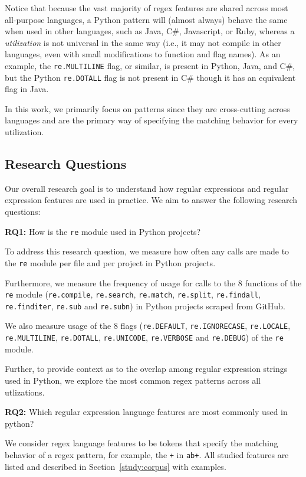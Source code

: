 Notice that because the vast majority of regex features are shared across most all-purpose languages, a Python {pattern} will (almost always) behave the same when used in other languages, such as Java, C\#, Javascript, or Ruby, whereas a \emph{utilization} is not universal in the same way (i.e., it may not compile in other languages, even with small modifications to function and flag names). As an example, the {\tt re.MULTILINE} flag, or similar, is present in Python, Java, and C\#, but  the Python {\tt re.DOTALL} flag is not present in C\# though it has an equivalent flag in Java.  

In this work, we primarily focus on patterns since they are cross-cutting across languages and are the primary way of specifying the matching behavior for every utilization.

\subsection{Research Questions}
Our overall research goal is to understand how regular expressions and regular expression features are used in practice. We aim to answer the following research questions:

\textbf{RQ1:} How  is the {\tt re} module used in Python projects?

To address this research question, we measure how often any calls are made to the {\tt re} module per file and per project in Python projects.

Furthermore, we measure the frequency of usage for calls to the 8 functions of the {\tt re} module ({\tt re.compile}, {\tt re.search}, {\tt re.match}, {\tt re.split}, {\tt re.findall}, {\tt re.finditer}, {\tt re.sub} and {\tt re.subn}) in Python projects scraped from GitHub.

We also measure usage of the 8 flags ({\tt re.DEFAULT}, {\tt re.IGNORECASE}, {\tt re.LOCALE}, {\tt re.MULTILINE}, {\tt re.DOTALL}, {\tt re.UNICODE}, {\tt re.VERBOSE} and {\tt re.DEBUG}) of the {\tt re} module.

Further, to provide context as to the overlap among regular expression strings used in Python, we explore the most common regex {patterns} across all utlizations.

\textbf{RQ2:} Which regular expression language features are most commonly used in python?

We consider regex language features to be tokens that specify the matching behavior of a regex pattern, for example,  the {\tt +} in {\tt ab+}.  All studied features are listed and described in Section~\ref{study:corpus} with examples.

